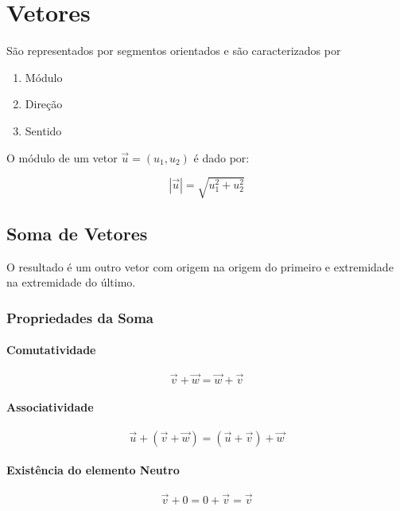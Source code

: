 \section{Vetores}\label{vetores}

São representados por segmentos orientados e são caracterizados por

\begin{enumerate}
\def\labelenumi{\arabic{enumi}.}
\itemsep1pt\parskip0pt
\item
  Módulo
\item
  Direção
\item
  Sentido
\end{enumerate}

O módulo de um vetor $\vec{u} = (u_1, u_2)$ é dado por:

\[
|\vec{u}| = \sqrt{u_1^2 + u_2^2}
\]

\subsection{Soma de Vetores}\label{soma-de-vetores}

O resultado é um outro vetor com origem na origem do primeiro e
extremidade na extremidade do último.

\subsubsection{Propriedades da Soma}\label{propriedades-da-soma}

\paragraph{Comutatividade}\label{comutatividade}

\[
\vec{v} + \vec{w} = \vec{w} + \vec{v}
\]

\paragraph{Associatividade}\label{associatividade}

\[
\vec{u} + (\vec{v} + \vec{w}) = (\vec{u} + \vec{v}) + \vec{w}
\]

\paragraph{Existência do elemento
Neutro}\label{existuxeancia-do-elemento-neutro}

\[
\vec{v} + 0 = 0 + \vec{v} = \vec{v}
\]


